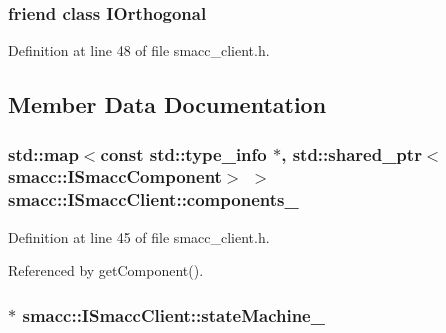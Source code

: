 \subsubsection[{\texorpdfstring{I\+Orthogonal}{IOrthogonal}}]{\setlength{\rightskip}{0pt plus 5cm}friend class {\bf I\+Orthogonal}\hspace{0.3cm}{\ttfamily [friend]}}\hypertarget{classsmacc_1_1ISmaccClient_a5fd6fcd01e77db4e3506afadec0d39dc}{}\label{classsmacc_1_1ISmaccClient_a5fd6fcd01e77db4e3506afadec0d39dc}


Definition at line 48 of file smacc\+\_\+client.\+h.



\subsection{Member Data Documentation}
\subsubsection[{\texorpdfstring{components\+\_\+}{components_}}]{\setlength{\rightskip}{0pt plus 5cm}std\+::map$<$const std\+::type\+\_\+info $\ast$, std\+::shared\+\_\+ptr$<${\bf smacc\+::\+I\+Smacc\+Component}$>$ $>$ smacc\+::\+I\+Smacc\+Client\+::components\+\_\+\hspace{0.3cm}{\ttfamily [protected]}}\hypertarget{classsmacc_1_1ISmaccClient_ab983e85d296c9660f5943c1d511634ce}{}\label{classsmacc_1_1ISmaccClient_ab983e85d296c9660f5943c1d511634ce}


Definition at line 45 of file smacc\+\_\+client.\+h.



Referenced by get\+Component().

\subsubsection[{\texorpdfstring{state\+Machine\+\_\+}{stateMachine_}}]{$\ast$ smacc\+::\+I\+Smacc\+Client\+::state\+Machine\+\_\+\hspace{0.3cm}{\ttfamily [protected]}}\hypertarget{classsmacc_1_1ISmaccClient_a926e4f2ae796def63d48dca389a48c47}{}\label{classsmacc_1_1ISmaccClient_a926e4f2ae796def63d48dca389a48c47}


